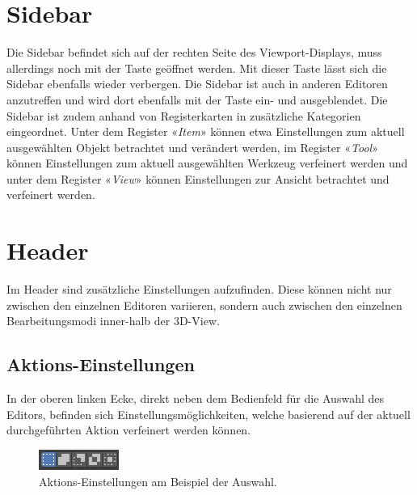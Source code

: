 \documentclass[
]{book}
\let\oldmarginnote\marginnote
\renewcommand{\marginnote}[1]{%
  \oldmarginnote{{\footnotesize\selectfont #1}}%
}
\newcommand{\kbd}[1]{\fbox{\texttt{#1}}}
\begin{document}
\section{Sidebar}\label{sidebar}

\marginnote{Sidebars}

Die Sidebar befindet sich auf der rechten Seite des Viewport-Displays,
muss allerdings noch mit der Taste \kbd{N} geöffnet werden. Mit dieser
Taste lässt sich die Sidebar ebenfalls wieder verbergen. Die Sidebar ist
auch in anderen Editoren anzutreffen und wird dort ebenfalls mit der
Taste\kbd{N} ein- und ausgeblendet. Die Sidebar ist zudem anhand von
Registerkarten in zusätzliche Kategorien eingeordnet. Unter dem Register
«\emph{Item}» können etwa Einstellungen zum aktuell ausgewählten Objekt
betrachtet und verändert werden, im Register «\emph{Tool}» können
Einstellungen zum aktuell ausgewählten Werkzeug verfeinert werden und
unter dem Register «\emph{View}» können Einstellungen zur Ansicht
betrachtet und verfeinert werden.

\section{Header}\label{header}

Im Header sind zusätzliche Einstellungen aufzufinden. Diese können nicht
nur zwischen den einzelnen Editoren variieren, sondern auch zwischen den
einzelnen Bearbeitungsmodi inner-halb der 3D-View.

\subsection{Aktions-Einstellungen}\label{aktions-einstellungen}

In der oberen linken Ecke, direkt neben dem Bedienfeld für die Auswahl
des Editors, befinden sich Einstellungsmöglichkeiten, welche basierend
auf der aktuell durchgeführten Aktion verfeinert werden können.

\begin{figure}

\includegraphics{Chapters/Images/Chapter_2/2_1_Actions_Parameters.png}

\caption{\label{fig-2_1}Aktions-Einstellungen am Beispiel der Auswahl.}

\end{figure}%
\end{document}
